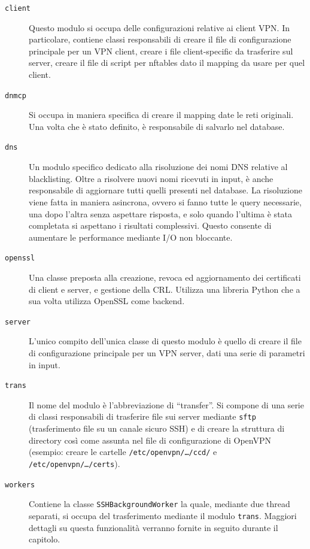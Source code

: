\begin{description}
	\item[\texttt{client}]Questo modulo si occupa delle configurazioni relative ai
	client VPN. In particolare, contiene classi responsabili di creare il file
	di configurazione principale per un VPN client, creare i file client-specific
	da trasferire sul server, creare il file di script per nftables dato il mapping
	da usare per quel client.
	\item[\texttt{dnmcp}]Si occupa in maniera specifica di creare il mapping date
	le reti originali. Una volta che è stato definito, è responsabile di salvarlo
	nel database.
	\item[\texttt{dns}]Un modulo specifico dedicato alla risoluzione dei nomi
	DNS relative al blacklisting. Oltre a risolvere nuovi nomi ricevuti in input,
	è anche responsabile di aggiornare tutti quelli presenti nel database.
	La risoluzione viene fatta in maniera asincrona, ovvero si fanno tutte le query
	necessarie, una dopo l'altra senza aspettare risposta, e solo quando l'ultima
	è stata completata si aspettano i risultati complessivi. Questo consente
	di aumentare le performance mediante I/O non bloccante.
	\item[\texttt{openssl}]Una classe preposta alla creazione, revoca ed aggiornamento
	dei certificati di client e server, e gestione della CRL. Utilizza una
	libreria Python che a sua volta utilizza OpenSSL come backend.
	\item[\texttt{server}]L'unico compito dell'unica classe di questo modulo è quello
	di creare il file di configurazione principale per un VPN server, dati una serie
	di parametri in input.
	\item[\texttt{trans}]Il nome del modulo è l'abbreviazione di ``transfer''. Si
	compone di una serie di classi responsabili di trasferire file sui server mediante
	\texttt{sftp} (trasferimento file su un canale sicuro SSH) e di creare
	la struttura di directory così come assunta nel file di configurazione di OpenVPN
	(esempio: creare le cartelle \texttt{/etc/openvpn/\ldots/ccd/} e \texttt{/etc/openvpn/\ldots/certs}).
	\item[\texttt{workers}]Contiene la classe \texttt{SSHBackgroundWorker} la quale, mediante
	due thread separati, si occupa del trasferimento mediante il modulo \texttt{trans}.
	Maggiori dettagli su questa funzionalità verranno fornite in seguito durante
	il capitolo.
\end{description}

